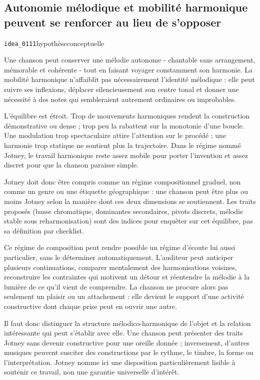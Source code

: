 \documentclass[10pt,a4paper]{article}
\begin{document}
\subsection{Autonomie mélodique et mobilité harmonique peuvent se renforcer au lieu de s'opposer}
{\small\color{metadata} \texttt{idea\_0111}\quad\textbullet\quad hypothèse\quad\textbullet\quad conceptuelle\par}

Une chanson peut conserver une mélodie autonome - chantable sans arrangement, mémorable et cohérente - tout en faisant voyager constamment son harmonie. La mobilité harmonique n'affaiblit pas nécessairement l'identité mélodique : elle peut suivre ses inflexions, déplacer silencieusement son centre tonal et donner une nécessité à des notes qui sembleraient autrement ordinaires ou improbables.

L'équilibre est étroit. Trop de mouvements harmoniques rendent la construction démonstrative ou dense ; trop peu la rabattent sur la monotonie d'une boucle. Une modulation trop spectaculaire attire l'attention sur le procédé ; une harmonie trop statique ne soutient plus la trajectoire. Dans le régime nommé Jotney, le travail harmonique reste assez mobile pour porter l'invention et assez discret pour que la chanson paraisse simple.

Jotney doit donc être compris comme un régime compositionnel graduel, non comme un genre ou une étiquette géographique : une chanson peut être plus ou moins Jotney selon la manière dont ces deux dimensions se soutiennent. Les traits proposés (basse chromatique, dominantes secondaires, pivots discrets, mélodie stable sous reharmonisation) sont des indices pour enquêter sur cet équilibre, pas sa définition par checklist.

Ce régime de composition peut rendre possible un régime d'écoute lui aussi particulier, sans le déterminer automatiquement. L'auditeur peut anticiper plusieurs continuations, comparer mentalement des harmonisations voisines, reconstruire les contraintes qui motivent un détour et réentendre la mélodie à la lumière de ce qu'il vient de comprendre. La chanson ne procure alors pas seulement un plaisir ou un attachement : elle devient le support d'une activité constructive dont chaque prise peut en ouvrir une autre.

Il faut donc distinguer la structure mélodico-harmonique de l'objet et la relation intéressante qui peut s'établir avec elle. Une chanson peut présenter des traits Jotney sans devenir constructive pour une oreille donnée ; inversement, d'autres musiques peuvent susciter des constructions par le rythme, le timbre, la forme ou l'interprétation. Jotney nomme ici une disposition particulièrement lisible à soutenir ce travail, non une garantie universelle d'intérêt.
\end{document}
